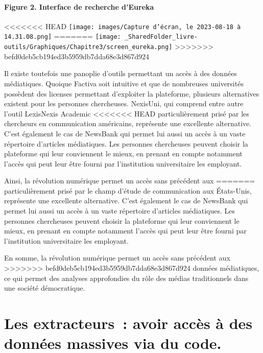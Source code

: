 \documentclass[
  letterpaper,
]{scrbook}
\let\oldparagraph\paragraph
\renewcommand{\paragraph}[1]{\oldparagraph{#1}\mbox{}}
\begin{document}
\hypertarget{figure-2.-interface-de-recherche-deureka}{%
\paragraph{Figure 2. Interface de recherche
d'Eureka}\label{figure-2.-interface-de-recherche-deureka}}

<<<<<<< HEAD
\texttt{[image: images/Capture d’écran, le 2023-08-18 à 14.31.08.png]}
=======
\texttt{[image: \_SharedFolder\_livre-outils/Graphiques/Chapitre3/screen\_eureka.png]}
>>>>>>> befd0deb5cb194ed3b5959db7dda68e3d867d924

Il existe toutefois une panoplie d'outils permettant un accès à des
données médiatiques. Quoique Factiva soit intuitive et que de nombreuses
universités possèdent des licenses permettant d'exploiter la plateforme,
plusieurs alternatives existent pour les personnes chercheuses.
NexisUni, qui comprend entre autre l'outil LexisNexis Academic
<<<<<<< HEAD
particulièrement prisé par les chercheurs en communication américains,
représente une excellente alternative. C'est également le cas de
NewsBank qui permet lui aussi un accès à un vaste répertoire d'articles
médiatiques. Les personnes chercheuses peuvent choisir la plateforme qui
leur conviennent le mieux, en prenant en compte notamment l'accès qui
peut leur être fourni par l'institution universitaire les employant.

Ainsi, la révolution numérique permet un accès sans précédent aux
=======
particulièrement prisé par le champ d'étude de communication aux
États-Unis, représente une excellente alternative. C'est également le
cas de NewsBank qui permet lui aussi un accès à un vaste répertoire
d'articles médiatiques. Les personnes chercheuses peuvent choisir la
plateforme qui leur conviennent le mieux, en prenant en compte notamment
l'accès qui peut leur être fourni par l'institution universitaire les
employant.

En somme, la révolution numérique permet un accès sans précédent aux
>>>>>>> befd0deb5cb194ed3b5959db7dda68e3d867d924
données médiatiques, ce qui permet des analyses approfondies du rôle des
médias traditionnels dans une société démocratique.

\hypertarget{les-extracteurs-avoir-accuxe8s-uxe0-des-donnuxe9es-massives-via-du-code.}{%
\section{\texorpdfstring{\textbf{Les extracteurs~: avoir accès à des
données massives via du
code.}}{Les extracteurs~: avoir accès à des données massives via du code.}}\label{les-extracteurs-avoir-accuxe8s-uxe0-des-donnuxe9es-massives-via-du-code.}}
\end{document}
